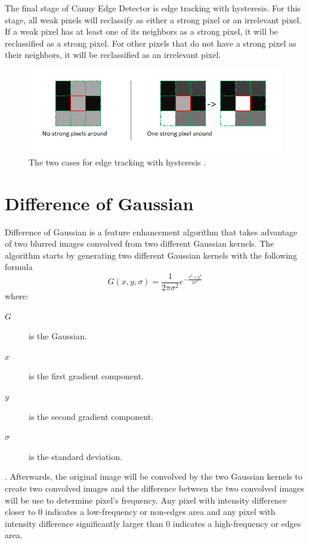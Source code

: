 \documentclass[conference]{IEEEtran}
\begin{document}
The final stage of Canny Edge Detector is edge tracking with hysteresis. For this stage, all weak pixels will reclassify as either a strong pixel or an irrelevant pixel. If a weak pixel has at least one of its neighbors as a strong pixel, it will be reclassified as a strong pixel. For other pixels that do not have a strong pixel as their neighbors, it will be reclassified as an irrelevant pixel.
\begin{figure}[!htb]
    \centering
    \includegraphics[scale = 0.3]{CED_hysteresis.png}
    \caption{The two cases for edge tracking with hysteresis \cite{sofiane-sahir:2019}.}
\end{figure}

\section{Difference of Gaussian}
Difference of Gaussian is a feature enhancement algorithm that takes advantage of two blurred images convolved from two different Gaussian kernels. The algorithm starts by generating two different Gaussian kernels with the following formula \cite{fisher-perkins-walker-wolfart-2:2003} \[G(x,y,\sigma)=\frac{1}{2\pi\sigma^2}e^{-\frac{x^2+y^2}{2\sigma^2}}\] where:
\begin{description}
    \item[$G$] is the Gaussian.
    \item[$x$] is the first gradient component.
    \item[$y$] is the second gradient component.
    \item[$\sigma$] is the standard deviation.
\end{description}
. Afterwards, the original image will be convolved by the two Gaussian kernels to create two convolved images and the difference between the two convolved images will be use to determine pixel's frequency. Any pixel with intensity difference closer to 0 indicates a low-frequency or non-edges area and any pixel with intensity difference significantly larger than 0 indicates a high-frequency or edges area.
\end{document}
